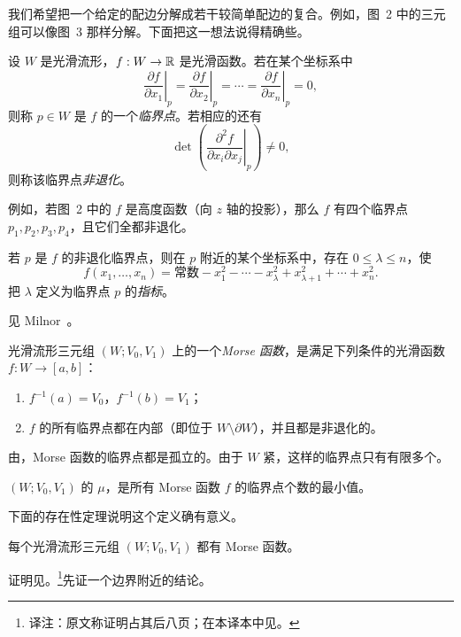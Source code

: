 
我们希望把一个给定的配边分解成若干较简单配边的复合。例如，图~2 中的三元组可以像图~3 那样分解。下面把这一想法说得精确些。

\begin{center}
  \FigTwoThree
\end{center}

设 $W$ 是光滑流形，$f:W\to\mathbb{R}$ 是光滑函数。若在某个坐标系中
\[
  \left.\frac{\partial f}{\partial x_1}\right|_p
  =\left.\frac{\partial f}{\partial x_2}\right|_p
  =\cdots=
  \left.\frac{\partial f}{\partial x_n}\right|_p=0,
\]
则称 $p\in W$ 是 $f$ 的一个\emph{临界点}。若相应的还有
\[
  \det\left(\left.\frac{\partial^2f}{\partial x_i\partial x_j}\right|_p\right)\neq0,
\]
则称该临界点\emph{非退化}。

例如，若图~2 中的 $f$ 是高度函数（向 $z$ 轴的投影），那么 $f$ 有四个临界点 $p_1,p_2,p_3,p_4$，且它们全都非退化。

若 $p$ 是 $f$ 的非退化临界点，则在 $p$ 附近的某个坐标系中，存在 $0\leq\lambda\leq n$，使
\[
  f(x_1,\ldots,x_n)=\text{常数}-x_1^2-\cdots-x_\lambda^2
  +x_{\lambda+1}^2+\cdots+x_n^2.
\]
把 $\lambda$ 定义为临界点 $p$ 的\emph{指标}。

\Proof 见 Milnor~\cite[p.~6]{ref04}。
\EndProof

光滑流形三元组 $(W;V_0,V_1)$ 上的一个\emph{Morse 函数}，是满足下列条件的光滑函数 $f:W\to[a,b]$：
\begin{enumerate}[label=(\arabic*)]
  \item $f^{-1}(a)=V_0$，$f^{-1}(b)=V_1$；
  \item $f$ 的所有临界点都在内部（即位于 $W\setminus\partial W$），并且都是非退化的。
\end{enumerate}

由，Morse 函数的临界点都是孤立的。由于 $W$ 紧，这样的临界点只有有限多个。

$(W;V_0,V_1)$ 的\emph{} $\mu$，是所有 Morse 函数 $f$ 的临界点个数的最小值。

下面的存在性定理说明这个定义确有意义。

每个光滑流形三元组 $(W;V_0,V_1)$ 都有 Morse 函数。

证明见。\footnote{译注：原文称证明占其后八页；在本译本中见。}先证一个边界附近的结论。

